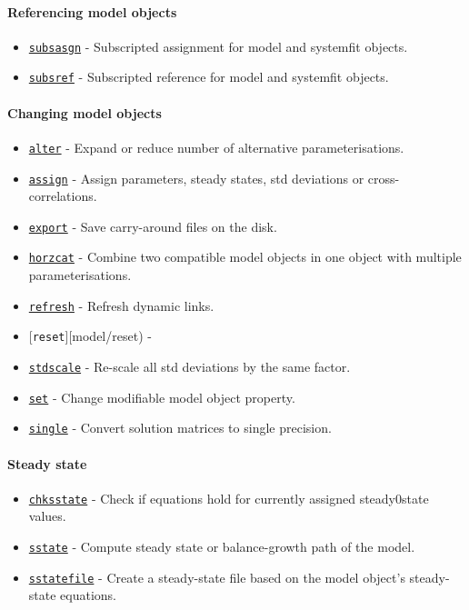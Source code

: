  \paragraph{Referencing model objects}
 
 \begin{itemize}
 \item
   \href{model/subsasgn}{\texttt{subsasgn}} - Subscripted assignment for
   model and systemfit objects.
 \item
   \href{model/subsref}{\texttt{subsref}} - Subscripted reference for
   model and systemfit objects.
 \end{itemize}
 
 \paragraph{Changing model objects}
 
 \begin{itemize}
 \item
   \href{model/alter}{\texttt{alter}} - Expand or reduce number of
   alternative parameterisations.
 \item
   \href{model/assign}{\texttt{assign}} - Assign parameters, steady
   states, std deviations or cross-correlations.
 \item
   \href{model/export}{\texttt{export}} - Save carry-around files on the
   disk.
 \item
   \href{model/horzcat}{\texttt{horzcat}} - Combine two compatible model
   objects in one object with multiple parameterisations.
 \item
   \href{model/refresh}{\texttt{refresh}} - Refresh dynamic links.
 \item
   {[}\texttt{reset}{]}{[}model/reset) -
 \item
   \href{model/stdscale}{\texttt{stdscale}} - Re-scale all std deviations
   by the same factor.
 \item
   \href{model/set}{\texttt{set}} - Change modifiable model object
   property.
 \item
   \href{model/single}{\texttt{single}} - Convert solution matrices to
   single precision.
 \end{itemize}
 
 \paragraph{Steady state}
 
 \begin{itemize}
 \item
   \href{model/chksstate}{\texttt{chksstate}} - Check if equations hold
   for currently assigned steady0state values.
 \item
   \href{model/sstate}{\texttt{sstate}} - Compute steady state or
   balance-growth path of the model.
 \item
   \href{model/sstatefile}{\texttt{sstatefile}} - Create a steady-state
   file based on the model object's steady-state equations.
 \end{itemize}
 
